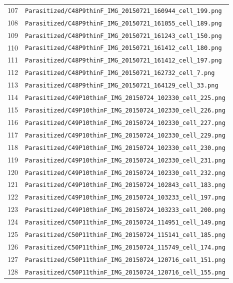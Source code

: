 \begin{longtable}{r p{12cm}}
107 & \texttt{Parasitized/C48P9thinF\_IMG\_20150721\_160944\_cell\_199.png} \\
108 & \texttt{Parasitized/C48P9thinF\_IMG\_20150721\_161055\_cell\_189.png} \\
109 & \texttt{Parasitized/C48P9thinF\_IMG\_20150721\_161243\_cell\_150.png} \\
110 & \texttt{Parasitized/C48P9thinF\_IMG\_20150721\_161412\_cell\_180.png} \\
111 & \texttt{Parasitized/C48P9thinF\_IMG\_20150721\_161412\_cell\_197.png} \\
112 & \texttt{Parasitized/C48P9thinF\_IMG\_20150721\_162732\_cell\_7.png} \\
113 & \texttt{Parasitized/C48P9thinF\_IMG\_20150721\_164129\_cell\_33.png} \\
114 & \texttt{Parasitized/C49P10thinF\_IMG\_20150724\_102330\_cell\_225.png} \\
115 & \texttt{Parasitized/C49P10thinF\_IMG\_20150724\_102330\_cell\_226.png} \\
116 & \texttt{Parasitized/C49P10thinF\_IMG\_20150724\_102330\_cell\_227.png} \\
117 & \texttt{Parasitized/C49P10thinF\_IMG\_20150724\_102330\_cell\_229.png} \\
118 & \texttt{Parasitized/C49P10thinF\_IMG\_20150724\_102330\_cell\_230.png} \\
119 & \texttt{Parasitized/C49P10thinF\_IMG\_20150724\_102330\_cell\_231.png} \\
120 & \texttt{Parasitized/C49P10thinF\_IMG\_20150724\_102330\_cell\_232.png} \\
121 & \texttt{Parasitized/C49P10thinF\_IMG\_20150724\_102843\_cell\_183.png} \\
122 & \texttt{Parasitized/C49P10thinF\_IMG\_20150724\_103233\_cell\_197.png} \\
123 & \texttt{Parasitized/C49P10thinF\_IMG\_20150724\_103233\_cell\_200.png} \\
124 & \texttt{Parasitized/C50P11thinF\_IMG\_20150724\_114951\_cell\_149.png} \\
125 & \texttt{Parasitized/C50P11thinF\_IMG\_20150724\_115141\_cell\_185.png} \\
126 & \texttt{Parasitized/C50P11thinF\_IMG\_20150724\_115749\_cell\_174.png} \\
127 & \texttt{Parasitized/C50P11thinF\_IMG\_20150724\_120716\_cell\_151.png} \\
128 & \texttt{Parasitized/C50P11thinF\_IMG\_20150724\_120716\_cell\_155.png} \\

\end{longtable}
